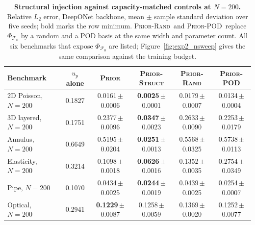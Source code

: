 \documentclass{article}
\newcommand{\armprior}{\textsc{Prior}}
\newcommand{\armstruct}{\textsc{Prior-Struct}}
\newcommand{\armrand}{\textsc{Prior-Rand}}
\newcommand{\armpod}{\textsc{Prior-POD}}
\begin{document}
\begin{table}[t]
    \centering
    \caption{\textbf{Structural injection against capacity-matched controls at $N{=}200$.}
    Relative $L_2$ error, DeepONet backbone, mean $\pm$ sample standard deviation over five seeds;
    bold marks the row minimum. \armrand\ and \armpod\ replace $\Phi_{\mathcal{F}_0}$ by a random and a POD basis at the same width and parameter count. All six benchmarks that expose $\Phi_{\mathcal{F}_0}$ are listed; Figure~\ref{fig:exp2_nsweep} gives the same comparison against the training budget.}
    \label{tab:exp1_structural}
    \scriptsize
    \setlength{\tabcolsep}{10pt}
    \renewcommand{\arraystretch}{0.7}
    \begin{tabular}{lccccc}
        \toprule
        Benchmark & $u_p$ alone & \armprior & \armstruct & \armrand & \armpod \\
        \midrule
        2D Poisson, $N=200$ & 0.1827 & 0.0161\,{\scriptsize$\pm$0.0006} & \textbf{0.0025}\,{\scriptsize$\pm$0.0001} & 0.0179\,{\scriptsize$\pm$0.0007} & 0.0134\,{\scriptsize$\pm$0.0004} \\
        3D layered, $N=200$ & 0.1751 & 0.2377\,{\scriptsize$\pm$0.0096} & \textbf{0.0347}\,{\scriptsize$\pm$0.0023} & 0.2633\,{\scriptsize$\pm$0.0090} & 0.2253\,{\scriptsize$\pm$0.0179} \\
        Annulus, $N=200$ & 0.6649 & 0.5195\,{\scriptsize$\pm$0.0204} & \textbf{0.0251}\,{\scriptsize$\pm$0.0013} & 0.5568\,{\scriptsize$\pm$0.0325} & 0.5738\,{\scriptsize$\pm$0.0113} \\
        Elasticity, $N=200$ & 0.3214 & 0.1098\,{\scriptsize$\pm$0.0018} & \textbf{0.0626}\,{\scriptsize$\pm$0.0016} & 0.1352\,{\scriptsize$\pm$0.0035} & 0.2754\,{\scriptsize$\pm$0.0349} \\
        Pipe, $N=200$ & 0.1070 & 0.0434\,{\scriptsize$\pm$0.0025} & \textbf{0.0244}\,{\scriptsize$\pm$0.0019} & 0.0439\,{\scriptsize$\pm$0.0025} & 0.0254\,{\scriptsize$\pm$0.0007} \\
        Optical, $N=200$ & 0.2941 & \textbf{0.1229}\,{\scriptsize$\pm$0.0087} & 0.1258\,{\scriptsize$\pm$0.0059} & 0.1369\,{\scriptsize$\pm$0.0020} & 0.1252\,{\scriptsize$\pm$0.0077} \\
        \bottomrule
    \end{tabular}
    \vspace{-5mm}
\end{table}
\end{document}
